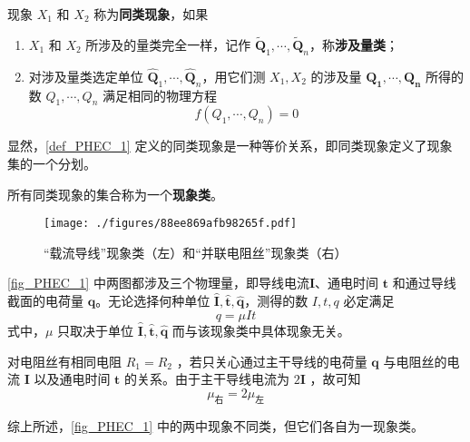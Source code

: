 \begin{definition}{}\label{def_PHEC_1}
现象 $X_1$ 和 $X_2$ 称为\textbf{同类现象}，如果
\begin{enumerate}
\item $X_1$ 和 $X_2$ 所涉及的量类完全一样，记作 $\tilde{\boldsymbol{Q}}_1,\cdots,\tilde{\boldsymbol{Q}}_n$，称\textbf{涉及量类}； 
\item 对涉及量类选定单位 $\hat{\boldsymbol{Q}}_1,\cdots,\hat{\boldsymbol{Q}}_n$，用它们测 $X_1,X_2$ 的涉及量 $\boldsymbol{Q_1},\cdots ,\boldsymbol{Q_n}$ 所得的数 $Q_1,\cdots,Q_n$ 满足相同的物理方程
\begin{equation}
f(Q_1,\cdots,Q_n)=0
\end{equation}
\end{enumerate}
\end{definition}
显然，\autoref{def_PHEC_1} 定义的同类现象是一种等价关系，即同类现象定义了现象集的一个分划。
\begin{definition}{}
所有同类现象的集合称为一个\textbf{现象类}。
\end{definition}
\begin{example}{}
\begin{figure}[ht]
\centering
\texttt{[image: ./figures/88ee869afb98265f.pdf]}
\caption{“载流导线”现象类（左）和“并联电阻丝”现象类（右）} \label{fig_PHEC_1}
\end{figure}
\autoref{fig_PHEC_1} 中两图都涉及三个物理量，即导线电流$\boldsymbol{I}$、通电时间 $\boldsymbol{t}$ 和通过导线截面的电荷量 $\boldsymbol{q}$。无论选择何种单位 $\hat{\boldsymbol{I}},\hat{\boldsymbol{t}},\hat{\boldsymbol{q}}$，测得的数 $I,t,q$ 必定满足
\begin{equation}
q=\mu It
\end{equation}
式中，$\mu$ 只取决于单位 $\hat{\boldsymbol{I}},\hat{\boldsymbol{t}},\hat{\boldsymbol{q}}$ 而与该现象类中具体现象无关。

对电阻丝有相同电阻 $R_1=R_2$ ，若只关心通过主干导线的电荷量 $\boldsymbol{q}$ 与电阻丝的电流 $\boldsymbol{I}$ 以及通电时间 $\boldsymbol{t}$ 的关系。由于主干导线电流为 $2\boldsymbol{I}$ ，故可知 
\begin{equation}
\mu_{\text{右}}=2\mu_{\text{左}}
\end{equation}

综上所述，\autoref{fig_PHEC_1} 中的两中现象不同类，但它们各自为一现象类。
\end{example}